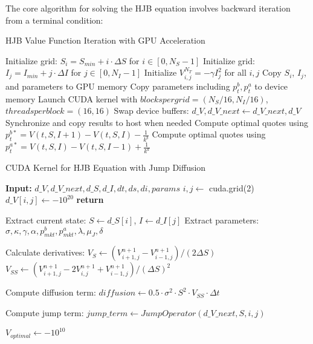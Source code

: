 \documentclass[twocolumn,ieee]{arithmaxresearch}
\begin{document}
\begin{onecolumn}
\begin{onecolumn}
The core algorithm for solving the HJB equation involves backward iteration from a terminal condition:


\begin{algorithm}
\caption{HJB Value Function Iteration with GPU Acceleration}
\begin{algorithmic}[1]
\State Initialize grid: $S_i = S_{min} + i \cdot \Delta S$ for $i \in [0, N_S-1]$
\State Initialize grid: $I_j = I_{min} + j \cdot \Delta I$ for $j \in [0, N_I-1]$
\State Initialize $V^{N_T}_{i,j} = -\gamma I_j^2$ for all $i,j$
\State Copy $S_i$, $I_j$, and parameters to GPU memory
    \State Copy parameters including $p^b_t, p^a_t$ to device memory
    \State Launch CUDA kernel with $blockspergrid=(N_S/16, N_I/16)$, $threadsperblock=(16, 16)$
    \State Swap device buffers: $d\_V, d\_V\_next \gets d\_V\_next, d\_V$
    \State Synchronize and copy results to host when needed
\EndFor
\State Compute optimal quotes using $p^{b*}_t = V(t,S,I+1) - V(t,S,I) - \frac{1}{k^b}$
\State Compute optimal quotes using $p^{a*}_t = V(t,S,I) - V(t,S,I-1) + \frac{1}{k^a}$
\end{algorithmic}
\end{algorithm}


\begin{algorithm}
\caption{CUDA Kernel for HJB Equation with Jump Diffusion}
\begin{algorithmic}[1]
\State \textbf{Input:} $d\_V, d\_V\_next, d\_S, d\_I, dt, ds, di, params$
\State $i, j \gets$ cuda.grid(2)
        \State $d\_V[i,j] \gets -10^{20}$ 
        \State \textbf{return}
    \EndIf
    
    \State Extract current state: $S \gets d\_S[i]$, $I \gets d\_I[j]$
    \State Extract parameters: $\sigma, \kappa, \gamma, \alpha, p^b_{mkt}, p^a_{mkt}, \lambda, \mu_J, \delta$
    
    \State Calculate derivatives:
    \State $V_S \gets (V^{n+1}_{i+1,j} - V^{n+1}_{i-1,j})/(2\Delta S)$
    \State $V_{SS} \gets (V^{n+1}_{i+1,j} - 2V^{n+1}_{i,j} + V^{n+1}_{i-1,j})/(\Delta S)^2$
    
    \State Compute diffusion term: $diffusion \gets 0.5 \cdot \sigma^2 \cdot S^2 \cdot V_{SS} \cdot \Delta t$
    
    \State Compute jump term: $jump\_term \gets JumpOperator(d\_V\_next, S, i, j)$
    
    \State $V_{optimal} \gets -10^{10}$ 
    

\end{algorithmic}
\end{algorithm}
\end{onecolumn}
\end{onecolumn}
\end{document}
